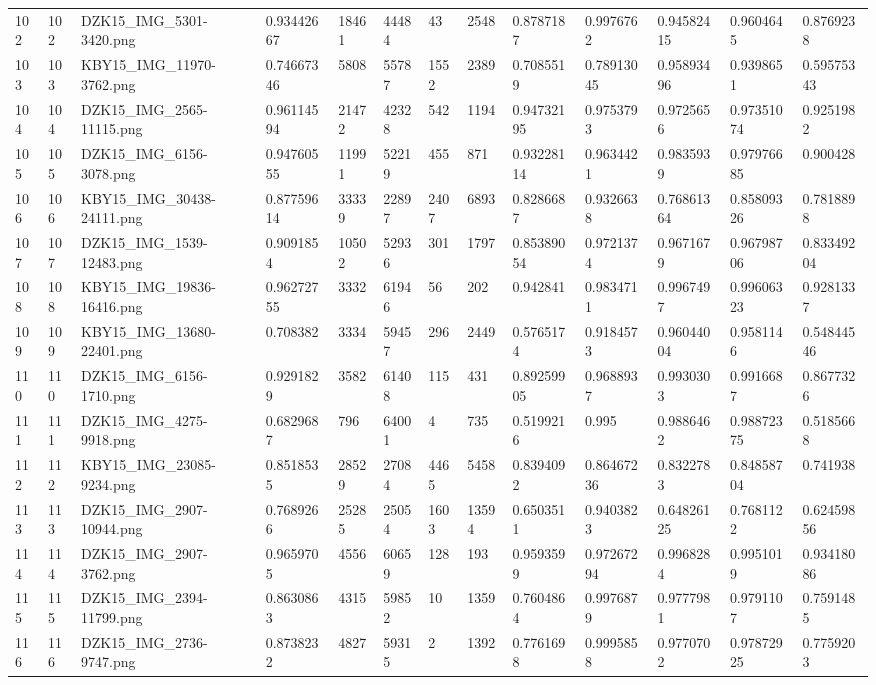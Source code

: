 \documentclass[11pt, a4paper, twoside]{report}
\begin{document}
\begin{longtable}[c]{@{}lllllllllllll@{}}
102 & 102 & DZK15\_IMG\_5301-3420.png & 0.93442667 & 18461 & 44484 & 43 & 2548 & 0.8787187 & 0.9976762 & 0.94582415 & 0.9604645 & 0.8769238 \\
103 & 103 & KBY15\_IMG\_11970-3762.png & 0.74667346 & 5808 & 55787 & 1552 & 2389 & 0.7085519 & 0.78913045 & 0.95893496 & 0.9398651 & 0.59575343 \\
104 & 104 & DZK15\_IMG\_2565-11115.png & 0.96114594 & 21472 & 42328 & 542 & 1194 & 0.94732195 & 0.9753793 & 0.9725656 & 0.97351074 & 0.9251982 \\
105 & 105 & DZK15\_IMG\_6156-3078.png & 0.94760555 & 11991 & 52219 & 455 & 871 & 0.93228114 & 0.9634421 & 0.9835939 & 0.97976685 & 0.900428 \\
106 & 106 & KBY15\_IMG\_30438-24111.png & 0.87759614 & 33339 & 22897 & 2407 & 6893 & 0.8286687 & 0.9326638 & 0.76861364 & 0.85809326 & 0.7818898 \\
107 & 107 & DZK15\_IMG\_1539-12483.png & 0.9091854 & 10502 & 52936 & 301 & 1797 & 0.85389054 & 0.9721374 & 0.9671679 & 0.96798706 & 0.83349204 \\
108 & 108 & KBY15\_IMG\_19836-16416.png & 0.96272755 & 3332 & 61946 & 56 & 202 & 0.942841 & 0.9834711 & 0.9967497 & 0.99606323 & 0.9281337 \\
109 & 109 & KBY15\_IMG\_13680-22401.png & 0.708382 & 3334 & 59457 & 296 & 2449 & 0.5765174 & 0.9184573 & 0.96044004 & 0.9581146 & 0.54844546 \\
110 & 110 & DZK15\_IMG\_6156-1710.png & 0.9291829 & 3582 & 61408 & 115 & 431 & 0.89259905 & 0.9688937 & 0.9930303 & 0.9916687 & 0.8677326 \\
111 & 111 & DZK15\_IMG\_4275-9918.png & 0.6829687 & 796 & 64001 & 4 & 735 & 0.5199216 & 0.995 & 0.9886462 & 0.98872375 & 0.5185668 \\
112 & 112 & KBY15\_IMG\_23085-9234.png & 0.8518535 & 28529 & 27084 & 4465 & 5458 & 0.8394092 & 0.86467236 & 0.8322783 & 0.84858704 & 0.741938 \\
113 & 113 & DZK15\_IMG\_2907-10944.png & 0.7689266 & 25285 & 25054 & 1603 & 13594 & 0.6503511 & 0.9403823 & 0.64826125 & 0.7681122 & 0.62459856 \\
114 & 114 & DZK15\_IMG\_2907-3762.png & 0.9659705 & 4556 & 60659 & 128 & 193 & 0.9593599 & 0.97267294 & 0.9968284 & 0.9951019 & 0.93418086 \\
115 & 115 & DZK15\_IMG\_2394-11799.png & 0.8630863 & 4315 & 59852 & 10 & 1359 & 0.7604864 & 0.9976879 & 0.9777981 & 0.9791107 & 0.7591485 \\
116 & 116 & DZK15\_IMG\_2736-9747.png & 0.8738232 & 4827 & 59315 & 2 & 1392 & 0.7761698 & 0.9995858 & 0.9770702 & 0.97872925 & 0.7759203 \\

\end{longtable}
\end{document}
